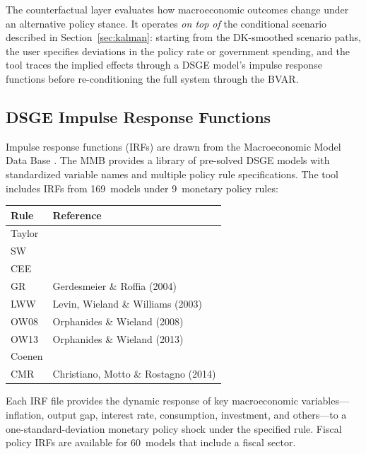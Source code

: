 \documentclass[11pt]{article}
\theoremstyle{definition}
\theoremstyle{remark}
\begin{document}
The counterfactual layer evaluates how macroeconomic outcomes change
under an alternative policy stance.  It operates \emph{on top of} the
conditional scenario described in Section~\ref{sec:kalman}: starting
from the DK-smoothed scenario paths, the user specifies deviations in
the policy rate or government spending, and the tool traces the
implied effects through a DSGE model's impulse response functions
before re-conditioning the full system through the BVAR.

\subsection{DSGE Impulse Response Functions}\label{sec:dsge}

Impulse response functions (IRFs) are drawn from the Macroeconomic
Model Data Base \citep[MMB;][]{WielandCwikMuellerSchmidtWolters2012,
WielandAfanasyevaYooKuete2016}.  The MMB provides a library of
pre-solved DSGE models with standardized variable names and multiple
policy rule specifications.  The tool includes IRFs from 169~models
under 9~monetary policy rules:

\begin{center}
\begin{tabular}{ll}
\toprule
\textbf{Rule} & \textbf{Reference} \\
\midrule
Taylor      & \citet{Taylor1993} \\
SW          & \citet{SmetsWouters2007} \\
CEE         & \citet{CEE2005} \\
GR          & Gerdesmeier \& Roffia (2004) \\
LWW         & Levin, Wieland \& Williams (2003) \\
OW08        & Orphanides \& Wieland (2008) \\
OW13        & Orphanides \& Wieland (2013) \\
Coenen      & \citet{Coenen2012} \\
CMR         & Christiano, Motto \& Rostagno (2014) \\
\bottomrule
\end{tabular}
\end{center}

Each IRF file provides the dynamic response of key macroeconomic
variables---inflation, output gap, interest rate, consumption,
investment, and others---to a one-standard-deviation monetary policy
shock under the specified rule.  Fiscal policy IRFs are available for
60~models that include a fiscal sector.
\end{document}
